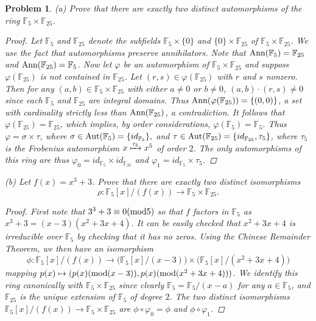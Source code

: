 \documentclass[11pt]{article}
\newcommand{\1}{\textbf{1}}
\newtheorem{prob}{Problem}
\begin{document}
\begin{prob}
(a) Prove that there are exactly two distinct automorphisms of the ring $\mathbb{F}_5\times \mathbb{F}_{25}$. 

\begin{proof}
Let $\mathbb{F}_5$ and $\mathbb{F}_{25}$ denote the subfields $\mathbb{F}_5\times\{0\}$ and $\{0\}\times \mathbb{F}_{25}$ of $\mathbb{F}_5\times\mathbb{F}_{25}$.  We use the fact that automorphisms preserve annihilators. Note that $\textnormal{Ann}(\mathbb{F}_5) = \mathbb{F}_{25}$ and $\textnormal{Ann}(\mathbb{F}_{25}) = \mathbb{F}_5$. Now let $\varphi$ be an automorphism of $\mathbb{F}_5\times\mathbb{F}_{25}$ and suppose $\varphi(\mathbb{F}_{25})$ is not contained in $\mathbb{F}_{25}$. Let $(r,s)\in\varphi(\mathbb{F}_{25})$ with $r$ and $s$ nonzero. Then for any $(a,b)\in \mathbb{F}_5\times\mathbb{F}_{25}$ with either $a\neq 0$ or $b\neq 0$, $(a,b)\cdot (r,s)\neq 0$ since each $\mathbb{F}_5$ and $\mathbb{F}_{25}$ are integral domains. Thus $\textnormal{Ann}(\varphi(\mathbb{F}_{25})) = \{(0,0)\}$, a set with cardinality strictly less than $\textnormal{Ann}(\mathbb{F}_{25})$, a contradiction. It follows that  $\varphi(\mathbb{F}_{25}) = \mathbb{F}_{25}$, which implies, by order considerations, $\varphi(\mathbb{F}_5) = \mathbb{F}_5$. Thus $\varphi = \sigma\times \tau$, where $\sigma\in\textnormal{Aut}(\mathbb{F}_5) = \{id_{\mathbb{F}_5}\},$ and $\tau\in\textnormal{Aut}(\mathbb{F}_{25}) = \{id_{\mathbb{F}_{25}}, \tau_5\}$, where $\tau_5$ is the Frobenius automorphism $x\xmapsto{\tau_5} x^5$ of order $2$. The only automorphisms of this ring are thus $\varphi_0 = id_{\mathbb{F}_5}\times id_{\mathbb{F}_{25}}$ and $\varphi_1 = id_{\mathbb{F}_5}\times\tau_5$. 
\end{proof}

\noindent (b) Let $f(x) = x^3 + 3$. Prove that there are exactly two distinct isomorphisms \[\rho: \mathbb{F}_5[x]/(f(x)) \rightarrow \mathbb{F}_5\times\mathbb{F}_{25}. \]

\begin{proof}
First note that $3^3+3 \equiv 0 (\textnormal{mod}5)$ so that $f$ factors in $\mathbb{F}_5$ as $x^3 + 3 = (x-3)(x^2 + 3x + 4)$. It can be easily checked that $x^2 + 3x + 4$ is irreducible over $\mathbb{F}_5$ by checking that it has no zeros. Using the Chinese Remainder Theorem, we then have an isomorphism \[\phi: \mathbb{F}_5[x]/(f(x))\rightarrow  \big(\mathbb{F}_5[x]/(x-3)\big)\times \big(\mathbb{F}_5[x]/(x^2 + 3x + 4)\big) \] mapping $p(x)\mapsto (p(x) (\textnormal{mod}(x-3)), p(x)(\textnormal{mod}(x^2 + 3x + 4)))$. We identify this ring canonically with $\mathbb{F}_5\times\mathbb{F}_{25}$ since clearly $\mathbb{F}_5 = \mathbb{F}_5/(x-a)$ for any $a\in\mathbb{F}_5$, and $\mathbb{F}_{25}$ is the unique extension of $\mathbb{F}_5$ of degree $2$. The two distinct isomorphisms $\mathbb{F}_5[x]/(f(x))\rightarrow\mathbb{F}_5\times\mathbb{F}_{25}$ are $\phi\circ\varphi_0 = \phi$ and $\phi\circ\varphi_1$. 
\end{proof}
\end{prob}
\end{document}
